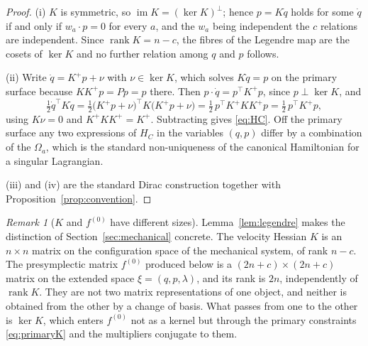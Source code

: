 \documentclass[12pt]{article}
\theoremstyle{plain}
\theoremstyle{definition}
\theoremstyle{remark}
\newtheorem{remark}[theorem]{Remark}
\DeclareMathOperator{\rank}{rank}
\DeclareMathOperator{\im}{im}
\newcommand{\Om}{\Omega}
\begin{document}
	\begin{proof}
		(i) $K$ is symmetric, so $\im K=(\ker K)^{\perp}$; hence $p=K\dot q$ holds
		for some $\dot q$ if and only if $w_{a}\!\cdot\!p=0$ for every $a$, and the
		$w_{a}$ being independent the $c$ relations are independent. Since
		$\rank K=n-c$, the fibres of the Legendre map are the cosets of $\ker K$ and
		no further relation among $q$ and $p$ follows.
		
		(ii) Write $\dot q=K^{+}p+\nu$ with $\nu\in\ker K$, which solves $K\dot q=p$
		on the primary surface because $KK^{+}p=Pp=p$ there. Then
		$p\!\cdot\!\dot q=p^{\top}K^{+}p$, since $p\perp\ker K$, and
		\[
		\tfrac12\dot q^{\top}K\dot q
		=\tfrac12\bigl(K^{+}p+\nu\bigr)^{\top}K\bigl(K^{+}p+\nu\bigr)
		=\tfrac12\,p^{\top}K^{+}KK^{+}p
		=\tfrac12\,p^{\top}K^{+}p ,
		\]
		using $K\nu=0$ and $K^{+}KK^{+}=K^{+}$. Subtracting gives \eqref{eq:HC}.
		Off the primary surface any two expressions of $H_{C}$ in the variables
		$(q,p)$ differ by a combination of the $\Om_{a}$, which is the standard
		non-uniqueness of the canonical Hamiltonian for a singular Lagrangian.
		
		(iii) and (iv) are the standard Dirac construction together with
		Proposition~\ref{prop:convention}.
	\end{proof}
	
	\begin{remark}[$K$ and $f^{(0)}$ have different sizes]
		\label{rem:KvsF}
		Lemma~\ref{lem:legendre} makes the distinction of
		Section~\ref{sec:mechanical} concrete. The velocity Hessian $K$ is an
		$n\times n$ matrix on the configuration space of the mechanical system,
		of rank $n-c$. The presymplectic matrix $f^{(0)}$ produced below is a
		$(2n+c)\times(2n+c)$ matrix on the extended space
		$\xi=(q,p,\lambda)$, and its rank is $2n$, independently of $\rank K$. They
		are not two matrix representations of one object, and neither is obtained
		from the other by a change of basis. What passes from one to the other is
		$\ker K$, which enters $f^{(0)}$ not as a kernel but through the primary
		constraints \eqref{eq:primaryK} and the multipliers conjugate to them.
	\end{remark}
	
\end{document}
